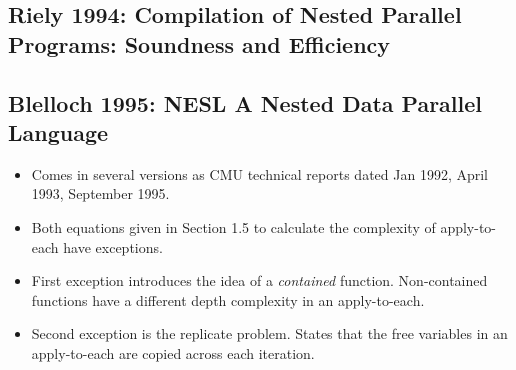 \subsection{Riely 1994: Compilation of Nested Parallel Programs: Soundness and Efficiency}


\subsection{Blelloch 1995: NESL A Nested Data Parallel Language}
\begin{itemize}
\item	Comes in several versions as CMU technical reports dated Jan 1992, April 1993, September 1995.
\item 	Both equations given in Section 1.5 to calculate the complexity of apply-to-each have exceptions. 
\item	First exception introduces the idea of a \emph{contained} function. Non-contained functions have a different depth complexity in an apply-to-each. 
\item	Second exception is the replicate problem. States that the free variables in an apply-to-each are copied across each iteration.
\end{itemize}


